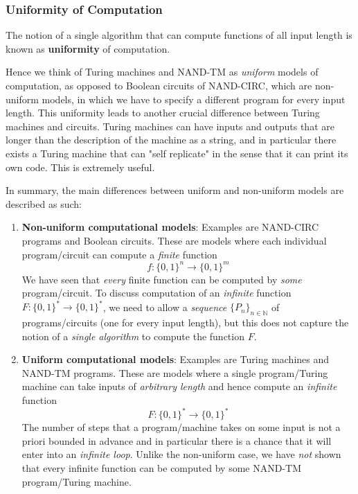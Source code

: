 \documentclass{article}
\begin{document}
  \subsubsection{Uniformity of Computation}
  \begin{definition}
  The notion of a single algorithm that can compute functions of all input length is known as \textbf{uniformity} of computation. 
  \end{definition}

  Hence we think of Turing machines and NAND-TM as \textit{uniform} models of computation, as opposed to Boolean circuits of NAND-CIRC, which are non-uniform models, in which we have to specify a different program for every input length. This uniformity leads to another crucial difference between Turing machines and circuits. Turing machines can have inputs and outputs that are longer than the description of the machine as a string, and in particular there exists a Turing machine that can "self replicate" in the sense that it can print its own code. This is extremely useful. 

  In summary, the main differences between uniform and non-uniform models are described as such: 
  \begin{enumerate}
      \item \textbf{Non-uniform computational models}: Examples are NAND-CIRC programs and Boolean circuits. These are models where each individual program/circuit can compute a \textit{finite} function 
      \[f: \{0,1\}^n \longrightarrow \{0,1\}^m\]
      We have seen that \textit{every} finite function can be computed by \textit{some} program/circuit. To discuss computation of an \textit{infinite} function $F: \{0,1\}^* \longrightarrow \{0,1\}^*$, we need to allow a \textit{sequence} $\big\{ P_n \big\}_{n \in \mathbb{N}}$ of programs/circuits (one for every input length), but this does not capture the notion of a \textit{single algorithm} to compute the function $F$. 
      \item \textbf{Uniform computational models}: Examples are Turing machines and NAND-TM programs. These are models where a single program/Turing machine can take inputs of \textit{arbitrary length} and hence compute an \textit{infinite} function 
      \[F: \{0,1\}^* \longrightarrow \{0,1\}^* \]
      The number of steps that a program/machine takes on some input is not a priori bounded in advance and in particular there is a chance that it will enter into an \textit{infinite loop}. Unlike the non-uniform case, we have \textit{not} shown that every infinite function can be computed by some NAND-TM program/Turing machine. 
  \end{enumerate}
\end{document}

